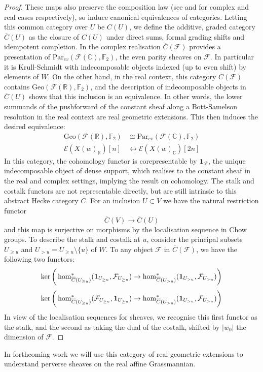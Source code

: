 \documentclass{amsart}
\theoremstyle{definition}
\theoremstyle{remark}
\begin{document}
\begin{proof}
These maps also preserve the composition law (see \cite{fulton2012intersectiontheory} and \cite{BorelHaefliger} for complex and real cases respectively), so induce canonical equivalences of categories. Letting this common category over $U$ be $C(U)$, we define the additive, graded category $\overline{C}(U)$ as the closure of $C(U)$ under direct sums, formal grading shifts and idempotent completion. In the complex realisation $\overline{C}(\mathscr{F})$ provides a presentation of $\mathrm{Par}_{ev}(\mathscr{F}(\mathbb{C}),\mathbb{F}_2)$, the even parity sheaves on $\mathscr{F}$. In particular it is Krull-Schmidt with indecomposable objects indexed (up to even shift) by elements of $W$. On the other hand, in the real context, this category $\overline{C}(\mathscr{F})$ contains $\mathrm{Geo}(\mathscr{F}(\mathbb{R}),\mathbb{F}_2)$, and the description of indecomposable objects in $\overline{C}(U)$ shows that this inclusion is an equivalence. In other words, the lower summands of the pushforward of the constant sheaf along a Bott-Samelson resolution in the real context are real geometric extensions.
This then induces the desired equivalence:\begin{align*}\mathrm{Geo}(\mathscr{F}(\mathbb{R}),\mathbb{F}_2)&\cong \mathrm{Par}_{ev}(\mathscr{F}(\mathbb{C}),\mathbb{F}_2)\\
\mathscr{E}(X(w)_\mathbb{R})[n]&\leftrightarrow \mathscr{E}(X(w)_\mathbb{C})[2n]
\end{align*}
In this category, the cohomology functor is corepresentable by $\mathbf{1}_{\mathscr{F}}$, the unique indecomposable object of dense support, which realises to the constant sheaf in the real and complex settings, implying the result on cohomology.
The stalk and costalk functors are not representable directly, but are still intrinsic to this abstract Hecke category $\overline{C}$. For an inclusion $U\subset V$ we have the natural restriction functor \[\overline{C}(V)\to \overline{C}(U)\] and this map is surjective on morphisms by the localisation sequence in Chow groups. 
To describe the stalk and costalk at $u$, consider the principal subsets $U_{\geq u}$ and $U_{>u}=U_{\geq u}\setminus \{u\}$ of $W$. To any object $\mathcal{F}$ in $\overline{C}(\mathscr{F})$, we have the following two functors:
\[\ker\bigg{(}\hom^*_{\overline{C}(U_{\geq u})}(\mathbf{1}_{U_{\geq u}},\mathcal{F}_{U_{\geq u}})\to \hom^*_{\overline{C}(U_{> u})}(\mathbf{1}_{U_{> u}},\mathcal{F}_{U_{> u}})\bigg{)}\]
\[\ker\bigg{(}\hom^*_{\overline{C}(U_{\geq u})}(\mathcal{F}_{U_{\geq u}},\mathbf{1}_{U_{\geq u}})\to \hom^*_{\overline{C}(U_{> u})}(\mathbf{1}_{U_{> u}},\mathcal{F}_{U_{> u}})\bigg{)}\]
In view of the localisation sequences for sheaves, we recognise this first functor as the stalk, and the second as taking the dual of the costalk, shifted by $|w_0|$ the dimension of $\mathscr{F}$. 
\end{proof}
In forthcoming work we will use this category of real geometric extensions to understand perverse sheaves on the real affine Grassmannian.
\end{document}
